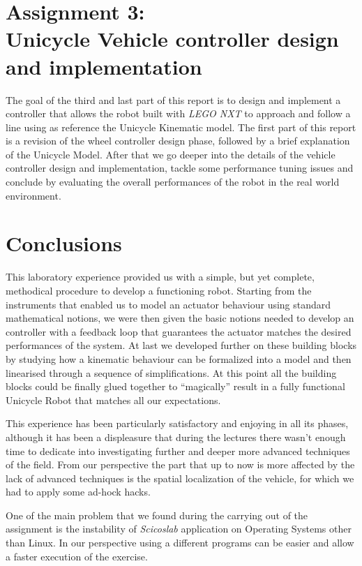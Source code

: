 \documentclass[12pt, a4paper, openany]{article}
\begin{document}

\newpage


\section{Assignment 3:\\ Unicycle Vehicle controller design and implementation}
The goal of the third and last part of this report is to design and implement a controller that allows the robot built with \textit{LEGO NXT} to approach and follow a line using as reference the Unicycle Kinematic model. The first part of this report is a revision of the wheel controller design phase, followed by a brief explanation of the Unicycle Model. After that we go deeper into the details of the vehicle controller design and implementation, tackle some performance tuning issues and conclude by evaluating the overall performances of the robot in the real world environment.


\newpage


\section{Conclusions}

This laboratory experience provided us with a simple, but yet complete, methodical procedure to develop a functioning robot. Starting from the instruments that enabled us to model an actuator behaviour using standard mathematical notions, we were then given the basic notions needed to develop an controller with a feedback loop that guarantees the actuator matches the desired performances of the system. At last we developed further on these building blocks by studying how a kinematic behaviour can be formalized into a model and then linearised through a sequence of simplifications. At this point all the building blocks could be finally glued together to ``magically'' result in a fully functional Unicycle Robot that matches all our expectations.

This experience has been particularly satisfactory and enjoying in all its phases, although it has been a displeasure that during the lectures there wasn't enough time to dedicate into investigating further and deeper more advanced techniques of the field. From our perspective the part that up to now is more affected by the lack of advanced techniques is the spatial localization of the vehicle, for which we had to apply some ad-hock hacks.

One of the main problem that we found during the carrying out of the assignment is the instability of \emph{Scicoslab} application on Operating Systems other than Linux. In our perspective using a different programs can be easier and allow a faster execution of the exercise.
\end{document}

